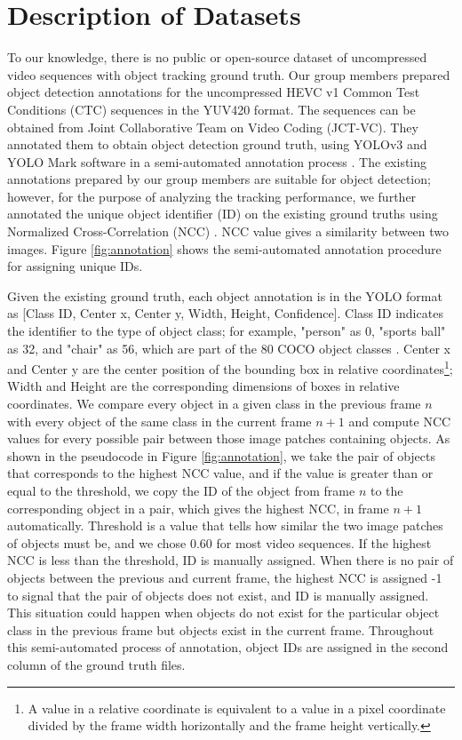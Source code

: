 \section{Description of Datasets}
\label{sec:methods/section_a}

To our knowledge, there is no public or open-source dataset of uncompressed video sequences with object tracking ground truth. Our group members prepared object detection annotations for the uncompressed HEVC v1 Common Test Conditions (CTC) sequences \cite{bossen_common_2013} in the YUV420 format. The sequences can be obtained from Joint Collaborative Team on Video Coding (JCT-VC). They annotated them to obtain object detection ground truth, using YOLOv3 \cite{redmon_yolov3_2018} and YOLO Mark software \cite{alexey_alexeyabyolo_mark_2021} in a semi-automated annotation process \cite{choi_dataset_2021}. The existing annotations prepared by our group members are suitable for object detection; however, for the purpose of analyzing the tracking performance, we further annotated the unique object identifier (ID) on the existing ground truths using Normalized Cross-Correlation (NCC) \cite{zhao_image_2006}. NCC value gives a similarity between two images. Figure \ref{fig:annotation} shows the semi-automated annotation procedure for assigning unique IDs.

Given the existing ground truth, each object annotation is in the YOLO format as [Class ID, Center x, Center y, Width, Height, Confidence]. Class ID indicates the identifier to the type of object class; for example, "person" as 0, "sports ball" as 32, and "chair" as 56, which are part of the 80 COCO object classes \cite{lin_microsoft_2014}. Center x and Center y are the center position of the bounding box in relative coordinates\footnote{A value in a relative coordinate is equivalent to a value in a pixel coordinate divided by the frame width horizontally and the frame height vertically.}; Width and Height are the corresponding dimensions of boxes in relative coordinates. We compare every object in a given class in the previous frame $n$ with every object of the same class in the current frame $n+1$ and compute NCC values for every possible pair between those image patches containing objects. As shown in the pseudocode in Figure \ref{fig:annotation}, we take the pair of objects that corresponds to the highest NCC value, and if the value is greater than or equal to the threshold, we copy the ID of the object from frame $n$ to the corresponding object in a pair, which gives the highest NCC, in frame $n+1$ automatically. Threshold is a value that tells how similar the two image patches of objects must be, and we chose 0.60 for most video sequences. If the highest NCC is less than the threshold, ID is manually assigned. When there is no pair of objects between the previous and current frame, the highest NCC is assigned -1 to signal that the pair of objects does not exist, and ID is manually assigned. This situation could happen when objects do not exist for the particular object class in the previous frame but objects exist in the current frame. Throughout this semi-automated process of annotation, object IDs are assigned in the second column of the ground truth files.
